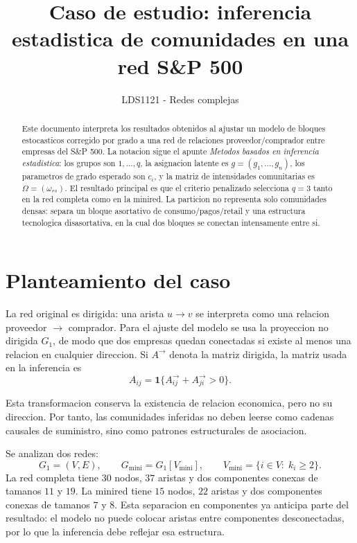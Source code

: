 \documentclass[11pt,letterpaper]{article}
\title{Caso de estudio: inferencia estadistica de comunidades en una red S\&P 500}
\author{LDS1121 - Redes complejas}
\date{}
\newcommand{\Gmini}{G_{\mathrm{mini}}}
\begin{document}
\maketitle

\begin{abstract}
Este documento interpreta los resultados obtenidos al ajustar un modelo de bloques estocasticos corregido por grado a una red de relaciones proveedor/comprador entre empresas del S\&P 500. La notacion sigue el apunte \emph{Metodos basados en inferencia estadistica}: los grupos son $1,\ldots,q$, la asignacion latente es $g=(g_1,\ldots,g_n)$, los parametros de grado esperado son $c_i$, y la matriz de intensidades comunitarias es $\Omega=(\omega_{rs})$. El resultado principal es que el criterio penalizado selecciona $q=3$ tanto en la red completa como en la minired. La particion no representa solo comunidades densas: separa un bloque asortativo de consumo/pagos/retail y una estructura tecnologica disasortativa, en la cual dos bloques se conectan intensamente entre si.
\end{abstract}

\section{Planteamiento del caso}

La red original es dirigida: una arista $u\to v$ se interpreta como una relacion proveedor $\to$ comprador. Para el ajuste del modelo se usa la proyeccion no dirigida $G_1$, de modo que dos empresas quedan conectadas si existe al menos una relacion en cualquier direccion. Si $A^\rightarrow$ denota la matriz dirigida, la matriz usada en la inferencia es
\[
    A_{ij}=\mathbf{1}\{A^\rightarrow_{ij}+A^\rightarrow_{ji}>0\}.
\]

Esta transformacion conserva la existencia de relacion economica, pero no su direccion. Por tanto, las comunidades inferidas no deben leerse como cadenas causales de suministro, sino como patrones estructurales de asociacion.

Se analizan dos redes:
\[
    G_1=(V,E),\qquad
    \Gmini=G_1[V_{\mathrm{mini}}],
    \qquad
    V_{\mathrm{mini}}=\{i\in V:\; k_i\ge 2\}.
\]
La red completa tiene $30$ nodos, $37$ aristas y dos componentes conexas de tamanos $11$ y $19$. La minired tiene $15$ nodos, $22$ aristas y dos componentes conexas de tamanos $7$ y $8$. Esta separacion en componentes ya anticipa parte del resultado: el modelo no puede colocar aristas entre componentes desconectadas, por lo que la inferencia debe reflejar esa estructura.
\end{document}
